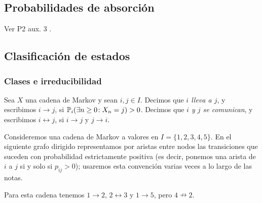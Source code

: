 \subsection{Probabilidades de absorción}

Ver P2 aux. 3 \ucmark.

\subsection{Clasificación de estados}

\subsubsection{Clases e irreducibilidad}

\begin{defn}
Sea $X$ una cadena de Markov y sean $i,j\in I$.
Decimos que \emph{$i$ lleva a $j$}, y escribimos $i\to j$, si $\mathbb{P}_i(\exists n\geq0\!:X_n=j)>0$.
Decimos que \emph{$i$ y $j$ se comunican}, y escribimos $i\leftrightarrow j$, si $i\to j$ y $j\to i$.
\end{defn}

\begin{ex}
Consideremos una cadena de Markov a valores en $I=\{1,2,3,4,5\}$.
En el siguiente grafo dirigido representamos por aristas entre nodos las transiciones que suceden con probabilidad estrictamente positiva (es decir, ponemos una arista de $i$ a $j$ si y solo si $p_{ij}>0$); usaremos esta convención varias veces a lo largo de las notas.
\begin{center}
\end{center}
Para esta cadena tenemos $1\to2$, $2\leftrightarrow3$ y $1\to5$, pero $4\nrightarrow2$.
\end{ex}


